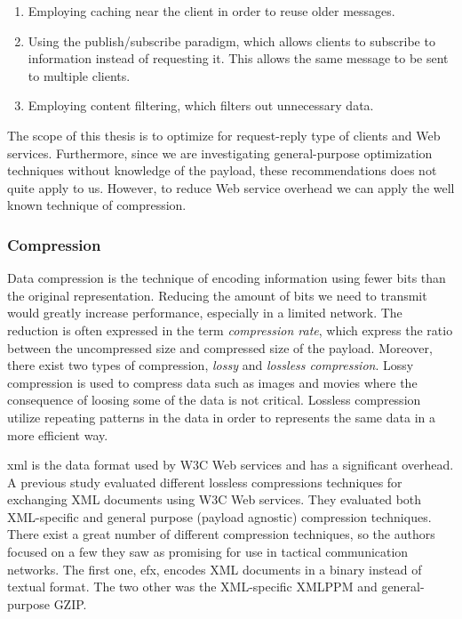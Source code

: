 \begin{enumerate}
    \item Employing caching near the client in order to reuse older messages.
    \item Using the publish/subscribe paradigm, which allows clients to subscribe to
    information instead of requesting it. This allows the same message to be sent
    to multiple clients.
    \item Employing content filtering, which filters out unnecessary data.
\end{enumerate}

The scope of this thesis is to optimize for request-reply type of clients
and Web services. Furthermore, since we are investigating general-purpose
optimization techniques without knowledge of the payload, these
recommendations does not quite apply to us. However, to reduce Web service
overhead we can apply the well known technique of compression.

\subsubsection{Compression}

Data compression is the technique of encoding information using fewer bits than
the original representation. Reducing the amount of bits we need to transmit
would greatly increase performance, especially in  a limited network. The
reduction is often expressed in the term \textit{compression rate}, which
express the ratio between the uncompressed size and compressed size of the
payload.  Moreover, there exist two types of compression, \textit{lossy} and
\textit{lossless compression}. Lossy compression is used to compress data such
as images and movies where the consequence of loosing some of the data is not
critical. Lossless compression utilize repeating patterns in the data in order
to represents the same data in a more efficient way.

\gls{xml} is the data format used by W3C Web services and has a significant
overhead. A previous study evaluated different lossless compressions techniques
for exchanging XML documents using W3C Web services\cite{johnsen-compression}.
They evaluated both XML-specific and general purpose (payload agnostic)
compression techniques. There exist a great number of different compression
techniques, so the authors focused on a few they saw as promising for use in
tactical communication networks. The first one, \gls{efx}, encodes XML documents
in a binary instead of textual format. The two other was the XML-specific XMLPPM
and general-purpose GZIP.

